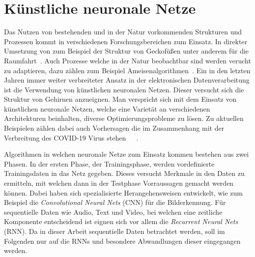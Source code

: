     \section{Künstliche neuronale Netze}
    \label{sec:KNN}        
        Das Nutzen von bestehenden und in der Natur vorkommenden Strukturen und Prozessen kommt in verschiedenen Forschungsbereichen zum Einsatz.
        In direkter Umsetzung von zum Beispiel der Struktur von Geckofüßen unter anderem für die Raumfahrt~\cite{GECKO}.%
        Auch Prozesse welche in der Natur beobachtbar sind werden verucht zu adaptieren, dazu zählen zum Beispiel Ameisenalgorithmen~\cite{ANT}.
        Ein in den letzten Jahren immer weiter verbreiteter Ansatz in der elektronischen Datenverarbeitung ist die Verwendung von künstlichen neuronalen Netzen.
        Dieser versucht sich die Struktur von Gehirnen anzueignen.
        Man verspricht sich mit dem Einsatz von künstlichen neuronale Netzen, welche eine Varietät an verschiedenen Architekturen beinhalten, diverse Optimierungsprobleme zu lösen.
        Zu aktuellen Beispielen zählen dabei auch Vorhersagen die im Zusammenhang mit der Verbreitung des COVID-19 Virus stehen~\cite{COVID1}~\cite{COVID2}~\cite{COVID3}.
        
        Algorithmen in welchen neuronale Netze zum Einsatz kommen bestehen aus zwei Phasen. 
        In der ersten Phase, der Trainingsphase, werden vordefinierte Trainingsdaten in das Netz gegeben.
        Dieses versucht Merkmale in den Daten zu ermitteln, mit welchen dann in der Testphase Vorraussagen gemacht werden können.
        Dabei haben sich spezialisierte Herangehensweisen entwickelt, wie zum Beispiel die \textit{Convolutional Neural Nets} (CNN) für die Bilderkennung. 
        Für sequentielle Daten wie Audio, Text und Video, bei welchen eine zeitliche Komponente entscheidend ist eignen sich vor allem die \textit{Recurrent Neural Nets} (RNN).
        Da in dieser Arbeit sequentielle Daten betrachtet werden, soll im Folgenden nur auf die RNNs und besondere Abwandlungen dieser eingegangen werden.
        
        
